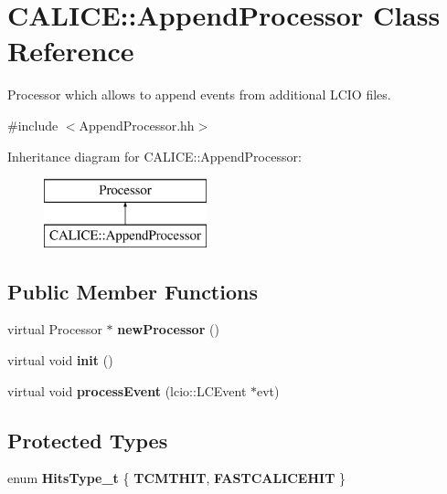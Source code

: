 \section{C\-A\-L\-I\-C\-E\-:\-:Append\-Processor Class Reference}
\label{classCALICE_1_1AppendProcessor}


Processor which allows to append events from additional L\-C\-I\-O files.  




{\ttfamily \#include $<$Append\-Processor.\-hh$>$}

Inheritance diagram for C\-A\-L\-I\-C\-E\-:\-:Append\-Processor\-:\begin{figure}[H]
\begin{center}
\leavevmode
\includegraphics[height=2.000000cm]{classCALICE_1_1AppendProcessor}
\end{center}
\end{figure}
\subsection*{Public Member Functions}
\begin{DoxyCompactItemize}
\item 
virtual Processor $\ast$ {\bfseries new\-Processor} ()\label{classCALICE_1_1AppendProcessor_a49551ee02f9d177c4d77a9c0248aba85}

\item 
virtual void {\bfseries init} ()\label{classCALICE_1_1AppendProcessor_ac589867ec7de2dee41f13db721261877}

\item 
virtual void {\bfseries process\-Event} (lcio\-::\-L\-C\-Event $\ast$evt)\label{classCALICE_1_1AppendProcessor_ab5b4a17cc986692a45f4d6e748df08ee}

\end{DoxyCompactItemize}
\subsection*{Protected Types}
\begin{DoxyCompactItemize}
\item 
enum {\bfseries Hits\-Type\-\_\-t} \{ {\bfseries T\-C\-M\-T\-H\-I\-T}, 
{\bfseries F\-A\-S\-T\-C\-A\-L\-I\-C\-E\-H\-I\-T}
 \}
\end{DoxyCompactItemize}
